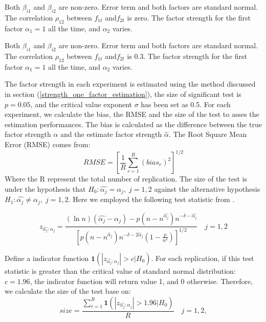 \begin{experiment}
Both $\beta_{i1}$ and $\beta_{i2}$ are non-zero. Error term and both factors are standard normal. The correlation $\rho_{12}$ between $f_{1t}$ and$f_{2t}$ is zero. 
The factor strength for the first factor $\alpha_1 = 1$ all the time, and $\alpha_2$ varies.
\end{experiment}

\begin{experiment}
Both $\beta_{i1}$ and $\beta_{i2}$ are non-zero. Error term  and both factors are standard normal. The correlation $\rho_{12}$ between $f_{1t}$ and$f_{2t}$ is 0.3.
The factor strength for the first factor $\alpha_1 = 1$ all the time, and $\alpha_2$ varies.
\end{experiment}

The factor strength in each experiment is estimated using the method discussed in section (\ref{strength_one_factor_estimation}), the size of significant test is $p = 0.05$, and the critical value exponent $\sigma$ has been set as 0.5.
For each experiment, we calculate the bias, the RMSE and the size of the test to asses the estimation performances.
The bias is calculated as the difference between the true factor strength $\alpha$ and the estimate factor strength $\hat{\alpha}$.
The Root Square Mean Error (RMSE) comes from:
\[ RMSE =[\frac{1}{R}\sum_{r=1}^{R}(bias_r)^2 ]^{1/2}\]
Where the R represent the total number of replication.
The size of the test is under the hypothesis that $H_0: \hat{\alpha_j} = \alpha_j,\;j =1, 2$ against the alternative hypothesis $H_1:\hat{\alpha_j} \neq \alpha_j,\; j=1,2$.
Here we employed the following test statistic from .

	\[  z_{\hat{\alpha_j}:\alpha_j} =\frac{(\ln n)\left(\hat{\alpha_j}-\alpha_{j}\right)-p\left(n-n^{\hat{\alpha_j}}\right) n^{-\delta-\hat{\alpha_j}}}{\left[p\left(n-n^{\hat{\alpha}_j}\right) n^{-\delta-2 \hat{\alpha}_j}\left(1-\frac{p}{n^{\delta}}\right)\right]^{1 / 2}}\quad j=1,2 \tag{8}  \label{z_indicator}\]

Define a indicator function $\mathbf{1}(|z_{\hat{\alpha_j}:\alpha_j} |>c|H_0)$.
For each replication, if this test statistic is greater than the critical value of standard normal distribution: $c = 1.96$, the indicator function will return value 1, and 0 otherwise.
Therefore, we calculate the size of the test base on:
	\[ size = \frac{\sum_{r=1}^{R} \mathbf{1}(|z_{\hat{\alpha_j}:\alpha_j} |>1.96|H_0)}{R} \quad j =1,2 \tag{9}, \label{size_calculator}\]

